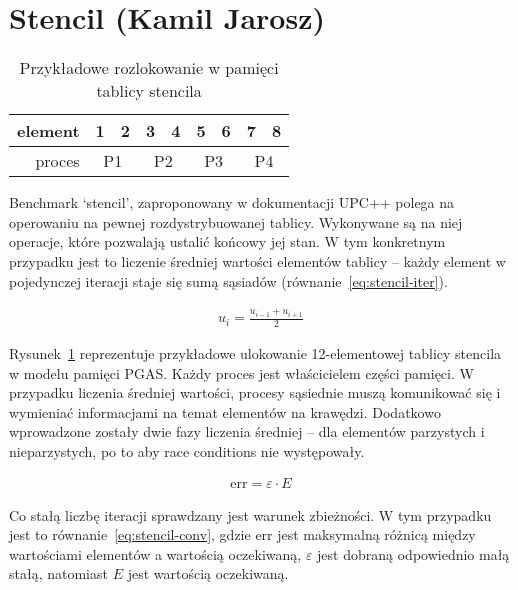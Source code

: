 \section{Stencil (Kamil Jarosz)}

\begin{table}[]
    \centering
    \begin{tabular}{|r|c|c|c|c|c|c|c|c|}
        \hline
        element & 1 & 2 & 3 & 4 & 5 & 6 & 7 & 8          \\ \hline
        proces & \multicolumn{2}{c|}{P1} & \multicolumn{2}{c|}{P2} & \multicolumn{2}{c|}{P3} & \multicolumn{2}{c|}{P4} \\ \hline
    \end{tabular}
    \caption{Przykładowe rozlokowanie w pamięci tablicy stencila}
    \label{fig:stencil-table}
\end{table}

Benchmark `stencil', zaproponowany w dokumentacji UPC++ polega
na operowaniu na pewnej rozdystrybuowanej tablicy.
Wykonywane są na niej operacje, które pozwalają ustalić końcowy jej stan.
W tym konkretnym przypadku jest to liczenie średniej wartości elementów tablicy
-- każdy element w pojedynczej iteracji staje się sumą sąsiadów
(równanie~\ref{eq:stencil-iter}).

\begin{gather}
    u_i = \frac{u_{i-1}+u_{i+1}}{2}
    \label{eq:stencil-iter}
\end{gather}

Rysunek~\ref{fig:stencil-table} reprezentuje przykładowe ulokowanie
12-elementowej tablicy stencila w modelu pamięci PGAS\@.
Każdy proces jest właścicielem części pamięci.
W przypadku liczenia średniej wartości, procesy sąsiednie muszą
komunikować się i wymieniać informacjami na temat elementów na krawędzi.
Dodatkowo wprowadzone zostały dwie fazy liczenia średniej -- dla elementów
parzystych i nieparzystych, po to aby race conditions nie występowały.

\begin{gather}
    \text{err} = \varepsilon \cdot E
    \label{eq:stencil-conv}
\end{gather}

Co stałą liczbę iteracji sprawdzany jest warunek zbieżności.
W tym przypadku jest to równanie~\ref{eq:stencil-conv},
gdzie $\text{err}$ jest maksymalną różnicą między wartościami
elementów a wartością oczekiwaną, $\varepsilon$ jest dobraną odpowiednio małą
stałą, natomiast $E$ jest wartością oczekiwaną.

